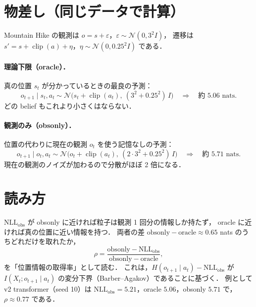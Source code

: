 \documentclass[a4paper,11pt]{article}
\begin{document}
\section{物差し（同じデータで計算）}

Mountain Hike の観測は $o=s+\varepsilon$，$\varepsilon\sim\mathcal{N}(0,3^2I)$，
遷移は $s'=s+\operatorname{clip}(a)+\eta$，$\eta\sim\mathcal{N}(0,0.25^2I)$ である．

\paragraph{理論下限（oracle）．} 真の位置 $s_t$ が分かっているときの最良の予測：
\begin{equation}
  o_{t+1}\mid s_t,a_t \sim \mathcal{N}\!\bigl(s_t+\operatorname{clip}(a_t),\ (3^2+0.25^2)\,I\bigr)
  \quad\Rightarrow\quad \text{約 } 5.06 \text{ nats}.
\end{equation}
どの belief もこれより小さくはならない．

\paragraph{観測のみ（obsonly）．} 位置の代わりに現在の観測 $o_t$ を使う記憶なしの予測：
\begin{equation}
  o_{t+1}\mid o_t,a_t \sim \mathcal{N}\!\bigl(o_t+\operatorname{clip}(a_t),\ (2\cdot 3^2+0.25^2)\,I\bigr)
  \quad\Rightarrow\quad \text{約 } 5.71 \text{ nats}.
\end{equation}
現在の観測のノイズが加わるので分散がほぼ 2 倍になる．

\section{読み方}

$\mathrm{NLL}_{\mathrm{obs}}$ が obsonly に近ければ粒子は観測 1 回分の情報しか持たず，
oracle に近ければ真の位置に近い情報を持つ．
両者の差 $\mathrm{obsonly}-\mathrm{oracle}\approx 0.65$ nats のうちどれだけを取れたか，
\begin{equation}
  \rho=\frac{\mathrm{obsonly}-\mathrm{NLL}_{\mathrm{obs}}}{\mathrm{obsonly}-\mathrm{oracle}},
\end{equation}
を「位置情報の取得率」として読む．
これは，$H(o_{t+1}\mid a_t)-\mathrm{NLL}_{\mathrm{obs}}$ が $I(X_t;o_{t+1}\mid a_t)$ の変分下界（Barber--Agakov）であることに基づく．
例として v2 transformer（seed 10）は $\mathrm{NLL}_{\mathrm{obs}}=5.21$，oracle $5.06$，obsonly $5.71$ で，$\rho\approx 0.77$ である．
\end{document}
